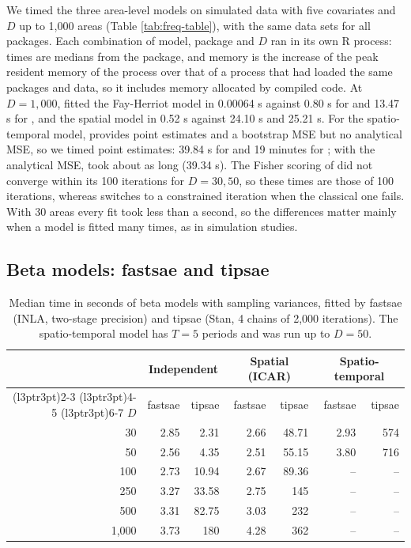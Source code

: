We timed the three area-level models on simulated data with five covariates and \(D\) up to 1,000 areas (Table \ref{tab:freq-table}), with the same data sets for all packages. Each combination of model, package and \(D\) ran in its own R process: times are medians from the  package, and memory is the increase of the peak resident memory of the process over that of a process that had loaded the same packages and data, so it includes memory allocated by compiled code. At \(D = 1{,}000\),  fitted the Fay-Herriot model in 0.00064 s against 0.80 s for  and 13.47 s for , and the spatial model in 0.52 s against 24.10 s and 25.21 s. For the spatio-temporal model,  provides point estimates and a bootstrap MSE but no analytical MSE, so we timed point estimates: 39.84 s for  and 19 minutes for ; with the analytical MSE,  took about as long (39.34 s). The Fisher scoring of  did not converge within its 100 iterations for \(D = 30, 50\), so these times are those of 100 iterations, whereas  switches to a constrained iteration when the classical one fails. With 30 areas every fit took less than a second, so the differences matter mainly when a model is fitted many times, as in simulation studies.

\subsection{Beta models: fastsae and tipsae}\label{sec:bench-beta}

\begin{table}[!h]
\centering
\caption{\label{tab:beta-table}Median time in seconds of beta models with sampling variances, fitted by fastsae (INLA, two-stage precision) and tipsae (Stan, 4 chains of 2,000 iterations). The spatio-temporal model has $T = 5$ periods and was run up to $D = 50$.}
\centering
\begin{tabular}[t]{rrrrrrr}
\toprule
\multicolumn{1}{c}{ } & \multicolumn{2}{c}{Independent} & \multicolumn{2}{c}{Spatial (ICAR)} & \multicolumn{2}{c}{Spatio-temporal} \\
\cmidrule(l{3pt}r{3pt}){2-3} \cmidrule(l{3pt}r{3pt}){4-5} \cmidrule(l{3pt}r{3pt}){6-7}
$D$ & fastsae & tipsae & fastsae & tipsae & fastsae & tipsae\\
\midrule
30 & 2.85 & 2.31 & 2.66 & 48.71 & 2.93 & 574\\
50 & 2.56 & 4.35 & 2.51 & 55.15 & 3.80 & 716\\
100 & 2.73 & 10.94 & 2.67 & 89.36 & -- & --\\
250 & 3.27 & 33.58 & 2.75 & 145 & -- & --\\
500 & 3.31 & 82.75 & 3.03 & 232 & -- & --\\
1,000 & 3.73 & 180 & 4.28 & 362 & -- & --\\
\bottomrule
\end{tabular}
\end{table}

